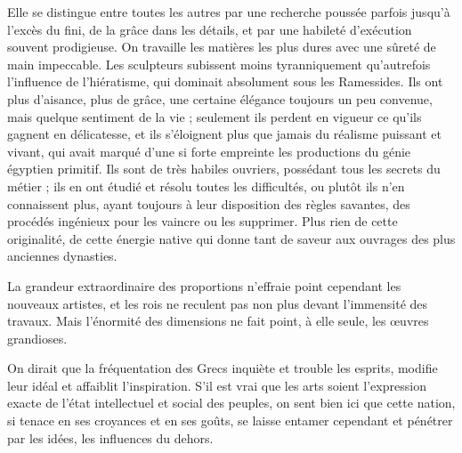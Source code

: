 \documentclass[letterpaper,twocolumn,openany,nodeprecatedcode]{dndbook}
\begin{document}
Elle se distingue entre toutes les autres par une recherche poussée parfois jusqu'à l'excès du fini, de la grâce dans les détails, et par une habileté d'exécution souvent prodigieuse. On travaille les matières les plus dures avec une sûreté de main impeccable. Les sculpteurs subissent moins tyranniquement qu'autrefois l'influence de l'hiératisme, qui dominait absolument sous les Ramessides. Ils ont plus d'aisance, plus de grâce, une certaine élégance toujours un peu convenue, mais quelque sentiment de la vie ; seulement ils perdent en vigueur ce qu'ils gagnent en délicatesse, et ils s'éloignent plus que jamais du réalisme puissant et vivant, qui avait marqué d'une si forte empreinte les productions du génie égyptien primitif. Ils sont de très habiles ouvriers, possédant tous les secrets du métier ; ils en ont étudié et résolu toutes les difficultés, ou plutôt ils n'en connaissent plus, ayant toujours à leur disposition des règles savantes, des procédés ingénieux pour les vaincre ou les supprimer. Plus rien de cette originalité, de cette énergie native qui donne tant de saveur aux ouvrages des plus anciennes dynasties.

La grandeur extraordinaire des proportions n'effraie point cependant les nouveaux artistes, et les rois ne reculent pas non plus devant l'immensité des travaux. Mais l'énormité des dimensions ne fait point, à elle seule, les œuvres grandioses.

On dirait que la fréquentation des Grecs inquiète et trouble les esprits, modifie leur idéal et affaiblit l'inspiration. S'il est vrai que les arts soient l'expression exacte de l'état intellectuel et social des peuples, on sent bien ici que cette nation, si tenace en ses croyances et en ses goûts, se laisse entamer cependant et pénétrer par les idées, les influences du dehors.
\end{document}
